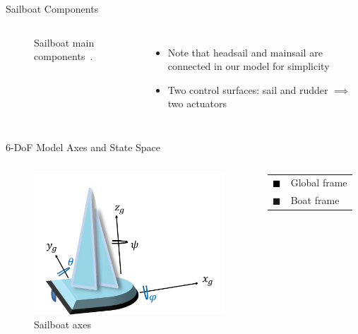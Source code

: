 \documentclass[10pt,xcolor={table,dvipsnames},t]{beamer}
\begin{document}
\begin{frame}{Sailboat Components}
\begin{columns}
\begin{figure}
        \caption{Sailboat main components~\cite{Alves2010}.}
        \label{fig:my_label}
    \end{figure}
\begin{itemize}
    \item Note that headsail and mainsail are connected in our model for simplicity
    \item Two control surfaces: sail and rudder \(\implies\) two actuators
\end{itemize}
\end{columns}

\end{frame}

\begin{frame}{6-DoF Model Axes and State Space}
\begin{columns}
\begin{figure}
    \centering
    \includegraphics[width = \linewidth, height = \textheight, keepaspectratio]{documents/figures/alves_boat_with_buehler_axes.png}
    \caption{Sailboat axes~\cite{Alves2010}}
    \label{fig:sailboat_components}
\end{figure}
\begin{tabular}{ll}
\textcolor{black}{\(\blacksquare\)}& Global frame \\
     \textcolor{officeblue}{\(\blacksquare\)}& Boat frame 
\end{tabular}
\begin{table}
    

\end{table}
\end{columns}
\end{frame}
\end{document}
